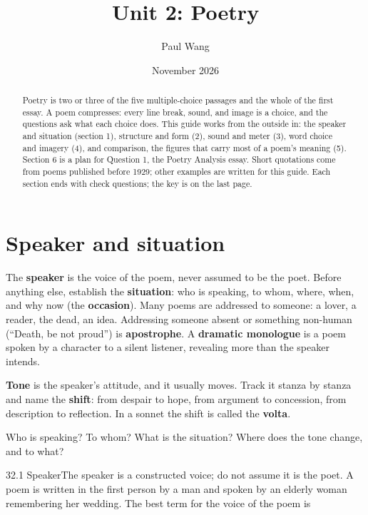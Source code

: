\documentclass[11pt]{article}
\title{Unit 2: Poetry}
\author{Paul Wang}
\date{November 2026}
\begin{document}
\maketitle

\begin{abstract}
Poetry is two or three of the five multiple-choice passages and the whole of the first essay. A poem compresses: every line break, sound, and image is a choice, and the questions ask what each choice does. This guide works from the outside in: the speaker and situation (section 1), structure and form (2), sound and meter (3), word choice and imagery (4), and comparison, the figures that carry most of a poem's meaning (5). Section 6 is a plan for Question 1, the Poetry Analysis essay. Short quotations come from poems published before 1929; other examples are written for this guide. Each section ends with check questions; the key is on the last page.
\end{abstract}


\section{Speaker and situation}
\label{sec:1}

The \textbf{speaker} is the voice of the poem, never assumed to be the poet. Before anything else, establish the \textbf{situation}: who is speaking, to whom, where, when, and why now (the \textbf{occasion}). Many poems are addressed to someone: a lover, a reader, the dead, an idea. Addressing someone absent or something non-human (``Death, be not proud'') is \textbf{apostrophe}. A \textbf{dramatic monologue} is a poem spoken by a character to a silent listener, revealing more than the speaker intends.

\textbf{Tone} is the speaker's attitude, and it usually moves. Track it stanza by stanza and name the \textbf{shift}: from despair to hope, from argument to concession, from description to reflection. In a sonnet the shift is called the \textbf{volta}.

\begin{keyidea}
Who is speaking? To whom? What is the situation? Where does the tone change, and to what?
\end{keyidea}

\begin{q}{3}{2.1 Speaker}{The speaker is a constructed voice; do not assume it is the poet.}
A poem is written in the first person by a man and spoken by an elderly woman remembering her wedding. The best term for the voice of the poem is
\end{q}
\end{document}
